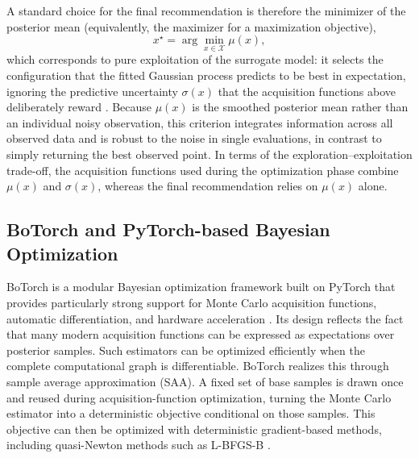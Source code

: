\documentclass[12pt,a4paper]{report}
\begin{document}
        A standard choice for the final recommendation is therefore the minimizer of the posterior mean (equivalently, the maximizer for a maximization objective),
        \[
        x^{\star}
        =
        \arg\min_{x\in\mathcal{X}}
        \mu(x),
        \]
        which corresponds to pure exploitation of the surrogate model: it selects the configuration that the fitted Gaussian process predicts to be best in expectation, ignoring the predictive uncertainty $\sigma(x)$ that the acquisition functions above deliberately reward \cite{shahriari2015taking,di2024active}. Because $\mu(x)$ is the smoothed posterior mean rather than an individual noisy observation, this criterion integrates information across all observed data and is robust to the noise in single evaluations, in contrast to simply returning the best observed point. In terms of the exploration--exploitation trade-off, the acquisition functions used during the optimization phase combine $\mu(x)$ and $\sigma(x)$, whereas the final recommendation relies on $\mu(x)$ alone.


        \subsection{BoTorch and PyTorch-based Bayesian Optimization}
        BoTorch is a modular Bayesian optimization framework built on PyTorch that provides particularly strong support for Monte Carlo acquisition functions, automatic differentiation, and hardware acceleration \cite{balandat2020botorch}. Its design reflects the fact that many modern acquisition functions can be expressed as expectations over posterior samples. Such estimators can be optimized efficiently when the complete computational graph is differentiable. BoTorch realizes this through sample average approximation (SAA). A fixed set of base samples is drawn once and reused during acquisition-function optimization, turning the Monte Carlo estimator into a deterministic objective conditional on those samples. This objective can then be optimized with deterministic gradient-based methods, including quasi-Newton methods such as L-BFGS-B \cite{balandat2019botorch}.
\end{document}
